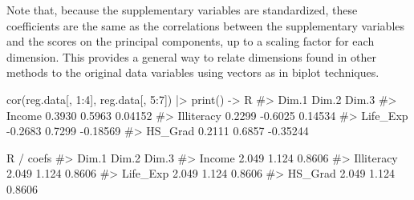 \documentclass[
  letterpaper,
  10pt,
  krantz2]{krantz}
\makeatletter
\newenvironment{Shaded}{\begin{snugshade}}{\end{snugshade}}
\newcommand{\AttributeTok}[1]{\textcolor[rgb]{0.40,0.45,0.13}{#1}}
\newcommand{\CommentTok}[1]{\textcolor[rgb]{0.37,0.37,0.37}{#1}}
\newcommand{\DecValTok}[1]{\textcolor[rgb]{0.68,0.00,0.00}{#1}}
\newcommand{\FloatTok}[1]{\textcolor[rgb]{0.68,0.00,0.00}{#1}}
\newcommand{\FunctionTok}[1]{\textcolor[rgb]{0.28,0.35,0.67}{#1}}
\newcommand{\NormalTok}[1]{\textcolor[rgb]{0.00,0.23,0.31}{#1}}
\newcommand{\OtherTok}[1]{\textcolor[rgb]{0.00,0.23,0.31}{#1}}
\newcommand{\SpecialCharTok}[1]{\textcolor[rgb]{0.37,0.37,0.37}{#1}}
\newenvironment{kframe}{%
  \medskip{}
  \setlength{\fboxsep}{.8em}
  \def\at@end@of@kframe{}%
  \ifinner\ifhmode%
  \def\at@end@of@kframe{\end{minipage}}%
  \begin{minipage}{\columnwidth}%
  \fi\fi%
  \def\FrameCommand##1{\hskip\@totalleftmargin \hskip-\fboxsep
  \colorbox{shadecolor}{##1}\hskip-\fboxsep
      \hskip-\linewidth \hskip-\@totalleftmargin \hskip\columnwidth}%
  \MakeFramed {\advance\hsize-\width
    \@totalleftmargin\z@ \linewidth\hsize
    \@setminipage}}%
{\par\unskip\endMakeFramed%
  \at@end@of@kframe}
\renewenvironment{Shaded}{\begin{kframe}}{\end{kframe}}
\makeatother
\begin{document}
\begin{Shaded}
\end{Shaded}

Note that, because the supplementary variables are standardized, these
coefficients are the same as the correlations between the supplementary
variables and the scores on the principal components, up to a scaling
factor for each dimension. This provides a general way to relate
dimensions found in other methods to the original data variables using
vectors as in biplot techniques.

\begin{Shaded}
\begin{Highlighting}[]
\FunctionTok{cor}\NormalTok{(reg.data[, }\DecValTok{1}\SpecialCharTok{:}\DecValTok{4}\NormalTok{], reg.data[, }\DecValTok{5}\SpecialCharTok{:}\DecValTok{7}\NormalTok{]) }\SpecialCharTok{|\textgreater{}}
  \FunctionTok{print}\NormalTok{() }\OtherTok{{-}\textgreater{}}\NormalTok{ R}
\CommentTok{\#\textgreater{}              Dim.1   Dim.2    Dim.3}
\CommentTok{\#\textgreater{} Income      0.3930  0.5963  0.04152}
\CommentTok{\#\textgreater{} Illiteracy  0.2299 {-}0.6025  0.14534}
\CommentTok{\#\textgreater{} Life\_Exp   {-}0.2683  0.7299 {-}0.18569}
\CommentTok{\#\textgreater{} HS\_Grad     0.2111  0.6857 {-}0.35244}

\NormalTok{R }\SpecialCharTok{/}\NormalTok{ coefs}
\CommentTok{\#\textgreater{}            Dim.1 Dim.2  Dim.3}
\CommentTok{\#\textgreater{} Income     2.049 1.124 0.8606}
\CommentTok{\#\textgreater{} Illiteracy 2.049 1.124 0.8606}
\CommentTok{\#\textgreater{} Life\_Exp   2.049 1.124 0.8606}
\CommentTok{\#\textgreater{} HS\_Grad    2.049 1.124 0.8606}
\end{Highlighting}
\end{Shaded}
\end{document}
